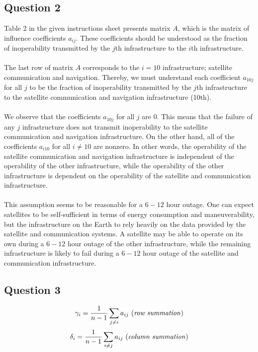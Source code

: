 \documentclass[11pt,a4paper]{article}
\begin{document}
\subsection*{Question 2}
Table 2 in the given instructions sheet presents matrix $A$, which is the matrix of influence coefficients $a_{ij}$. These coefficients should be understood as the fraction of inoperability transmitted by the $j$th infrastructure to the $i$th infrastructure. \\
\\
The last row of matrix $A$ corresponds to the $i = 10$ infrastructure; satellite communication and navigation. Thereby, we must understand each coefficient $a_{10j}$ for all $j$ to be the fraction of inoperability transmitted by the $j$th infrastructure to the satellite communication and navigation infrastructure (10th).\\
\\
We observe that the coefficients $a_{10j}$ for all $j$ are $0$. This means that the failure of any $j$ infrastructure does not transmit inoperability to the satellite communication and navigation infrastructure. On the other hand, all of the coefficients $a_{i10}$ for all $i \neq 10$ are nonzero. In other words, the operability of the satellite communication and navigation infrastructure is independent of the operability of the other infrastructure, while the operability of the other infrastructure is dependent on the operability of the satellite and communication infrastructure. \\
\\
This assumption seems to be reasonable for a $6-12$ hour outage. One can expect satellites to be self-sufficient in terms of energy consumption and maneuverability, but the infrastructure on the Earth to rely heavily on the data provided by the satellite and communication systems. A satellite may be able to operate on its own during a $6-12$ hour outage of the other infrastructure, while the remaining infrastructure is likely to fail during a $6-12$ hour outage of the satellite and communication infrastructure.

\subsection*{Question 3}
\begin{align}
	\gamma_i = \frac{1}{n-1}\sum_{j \neq i} a_{ij} \text{ (\textit{row summation})}
\end{align}
\begin{align}
	\delta_i = \frac{1}{n-1}\sum_{i \neq j} a_{ij} \text{ (\textit{column summation})}
\end{align}
\end{document}
